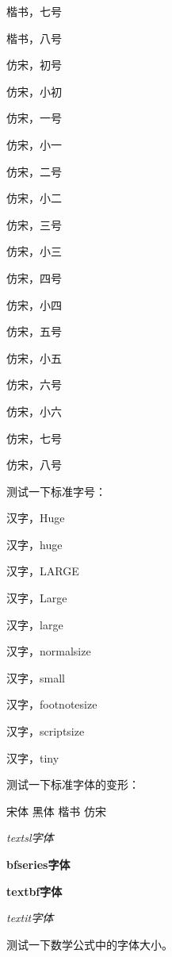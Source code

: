 {\kaishu{} 楷书，七号}

{\kaishu{} 楷书，八号}

{\fangsong{} 仿宋，初号}

{\fangsong{} 仿宋，小初}

{\fangsong{} 仿宋，一号}

{\fangsong{} 仿宋，小一}

{\fangsong{} 仿宋，二号}

{\fangsong{} 仿宋，小二}

{\fangsong{} 仿宋，三号}

{\fangsong{} 仿宋，小三}

{\fangsong{} 仿宋，四号}

{\fangsong{} 仿宋，小四}

{\fangsong{} 仿宋，五号}

{\fangsong{} 仿宋，小五}

{\fangsong{} 仿宋，六号}

{\fangsong{} 仿宋，小六}

{\fangsong{} 仿宋，七号}

{\fangsong{} 仿宋，八号}

测试一下标准字号：

{\Huge 汉字，Huge}

{\huge 汉字，huge}

{\LARGE 汉字，LARGE}

{\Large 汉字，Large}

{\large 汉字，large}

{\normalsize 汉字，normalsize}

{\small 汉字，small}

{\footnotesize 汉字，footnotesize}

{\scriptsize 汉字，scriptsize}

{\tiny 汉字，tiny}

测试一下标准字体的变形：

{\songti 宋体} {\heiti 黑体} {\kaishu 楷书} {\fangsong 仿宋}

{\textsl{textsl字体}}

{\bfseries bfseries字体}

{\textbf{textbf字体}}

{\textit{textit字体}}

测试一下数学公式中的字体大小。

\newcommand{\set}[1]{\left\{\,#1\,\right\}}
\newcommand{\card}[1]{\left|\,#1\,\right|}

